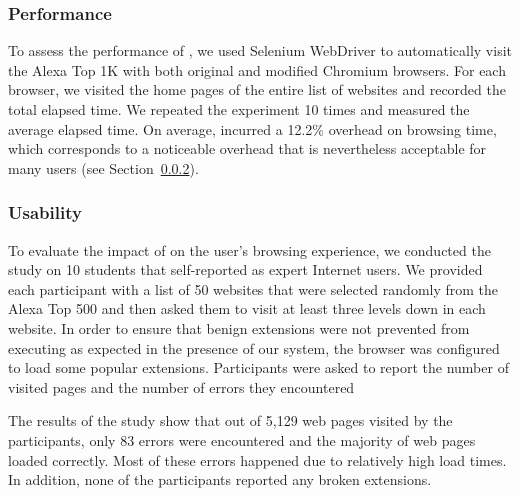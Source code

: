 \subsubsection{Performance}
\label{inclusion:sec:performance}

To assess the performance of \excision, we used Selenium WebDriver to
automatically visit the Alexa Top 1K with both original and modified Chromium
browsers. For each browser, we visited the home pages of the entire list of
websites and recorded the total elapsed time. We repeated the experiment 10
times and measured the average elapsed time. On average, \excision incurred a
12.2\% overhead on browsing time, which corresponds to a noticeable overhead
that is nevertheless acceptable for many users (see
Section~\ref{inclusion:sec:usability}).

\subsubsection{Usability}
\label{inclusion:sec:usability}

To evaluate the impact of \excision on the user's browsing experience, we
conducted the study on 10 students that self-reported as expert Internet users.
We provided each participant with a list of 50 websites that were selected
randomly from the Alexa Top 500 and then asked them to visit at least three
levels down in each website. In order to ensure that benign extensions were not
prevented from executing as expected in the presence of our system, the browser
was configured to load some popular extensions. Participants were asked to
report the number of visited pages and the number of errors they encountered

The results of the study show that out of 5,129 web pages visited by the
participants, only 83 errors were encountered and the majority of web pages
loaded correctly. Most of these errors happened due to relatively high load
times. In addition, none of the participants reported any broken extensions.
